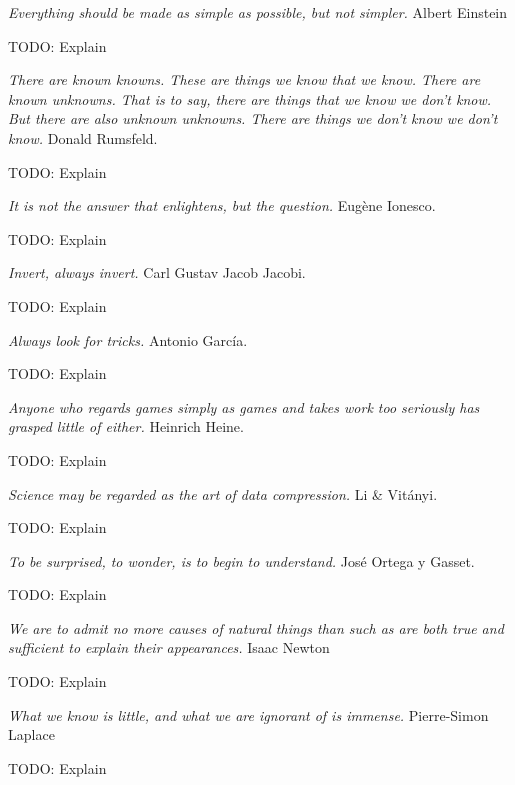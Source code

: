 \emph{Everything should be made as simple as possible, but not simpler.} Albert Einstein

{\color{red} TODO: Explain}

\bigskip

\emph{There are known knowns. These are things we know that we know. There are known unknowns. That is to say, there are things that we know we don’t know. But there are also unknown
unknowns. There are things we don’t know we don’t know.} Donald Rumsfeld.

{\color{red} TODO: Explain}

\bigskip

\emph{It is not the answer that enlightens, but the question.} Eugène Ionesco.

{\color{red} TODO: Explain}

\bigskip

\emph{Invert, always invert.} Carl Gustav Jacob Jacobi.

{\color{red} TODO: Explain}

\bigskip

\emph{Always look for tricks.} Antonio García.

{\color{red} TODO: Explain}

\bigskip

\emph{Anyone who regards games simply as games and takes work too seriously has grasped little of either.} Heinrich Heine.

{\color{red} TODO: Explain}

\bigskip

\emph{Science may be regarded as the art of data compression.} Li \& Vitányi.

{\color{red} TODO: Explain}

\bigskip

\emph{To be surprised, to wonder, is to begin to understand.} José Ortega y Gasset.

{\color{red} TODO: Explain}

\bigskip

\emph{We are to admit no more causes of natural things than such as are both true and sufficient to explain their appearances.} Isaac Newton

{\color{red} TODO: Explain}

\bigskip

\emph{What we know is little, and what we are ignorant of is immense.} Pierre-Simon Laplace

{\color{red} TODO: Explain}

\bigskip

